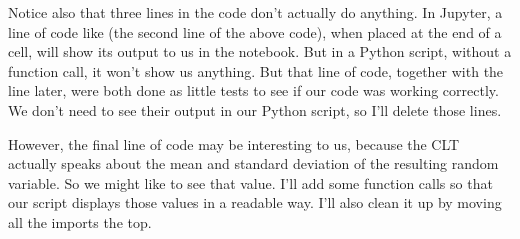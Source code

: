 \documentclass[letterpaper,10pt,english]{sphinxmanual}
\begin{document}
Notice also that three lines in the code don’t actually do anything.  In Jupyter, a line of code like  (the second line of the above code), when placed at the end of a cell, will show its output to us in the notebook.  But in a Python script, without a  function call, it won’t show us anything.  But that line of code, together with the  line later, were both done as little tests to see if our code was working correctly.  We don’t need to see their output in our Python script, so I’ll delete those lines.

However, the final line of code may be interesting to us, because the CLT actually speaks about the mean and standard deviation of the resulting random variable.  So we might like to see that value.  I’ll add some  function calls so that our script displays those values in a readable way.  I’ll also clean it up by moving all the imports the top.

\begin{sphinxVerbatim}[commandchars=\\\{\}]
   
   

  
       

  \PYG{p}{[}      \PYG{p}{]}
   

     
     
\end{sphinxVerbatim}
\end{document}
